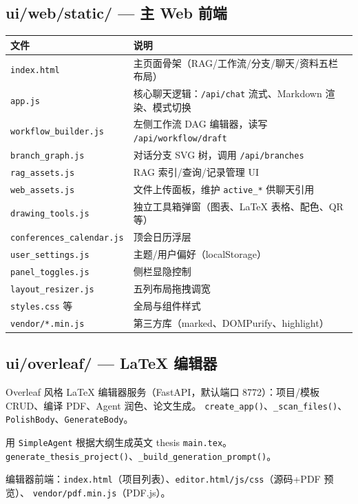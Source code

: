 \subsection{ui/web/static/ — 主 Web 前端}

\begin{longtable}{@{}p{}p{}@{}}
\toprule
\textbf{文件} & \textbf{说明} \\
\midrule
\endhead
\texttt{index.html} & 主页面骨架（RAG/工作流/分支/聊天/资料五栏布局） \\
\texttt{app.js} & 核心聊天逻辑：\texttt{/api/chat} 流式、Markdown 渲染、模式切换 \\
\texttt{workflow\_builder.js} & 左侧工作流 DAG 编辑器，读写 \texttt{/api/workflow/draft} \\
\texttt{branch\_graph.js} & 对话分支 SVG 树，调用 \texttt{/api/branches} \\
\texttt{rag\_assets.js} & RAG 索引/查询/记录管理 UI \\
\texttt{web\_assets.js} & 文件上传面板，维护 \texttt{active\_*} 供聊天引用 \\
\texttt{drawing\_tools.js} & 独立工具箱弹窗（图表、LaTeX 表格、配色、QR 等） \\
\texttt{conferences\_calendar.js} & 顶会日历浮层 \\
\texttt{user\_settings.js} & 主题/用户偏好（localStorage） \\
\texttt{panel\_toggles.js} & 侧栏显隐控制 \\
\texttt{layout\_resizer.js} & 五列布局拖拽调宽 \\
\texttt{styles.css} 等 & 全局与组件样式 \\
\texttt{vendor/*.min.js} & 第三方库（marked、DOMPurify、highlight） \\
\bottomrule
\end{longtable}

\subsection{ui/overleaf/ — LaTeX 编辑器}

\begin{description}[leftmargin=4em,style=nextline]
    \item[\texttt{server.py}]
    Overleaf 风格 LaTeX 编辑器服务（FastAPI，默认端口 8772）：项目/模板 CRUD、编译 PDF、Agent 润色、论文生成。
    \texttt{create\_app()}、\texttt{\_scan\_files()}、\texttt{PolishBody}、\texttt{GenerateBody}。

    \item[\texttt{thesis\_generator.py}]
    用 \texttt{SimpleAgent} 根据大纲生成英文 thesis \texttt{main.tex}。
    \texttt{generate\_thesis\_project()}、\texttt{\_build\_generation\_prompt()}。

    \item[\texttt{static/}]
    编辑器前端：\texttt{index.html}（项目列表）、\texttt{editor.html/js/css}（源码+PDF 预览）、
    \texttt{vendor/pdf.min.js}（PDF.js）。
\end{description}

